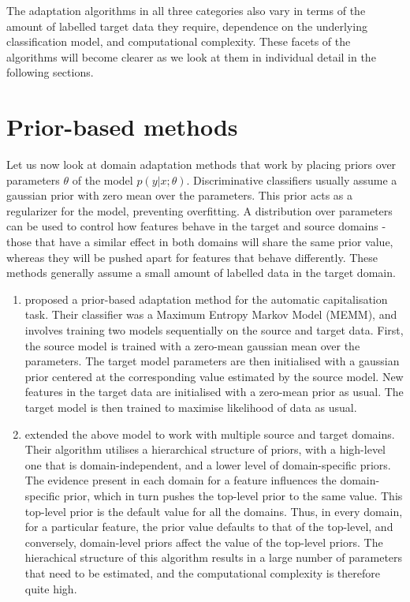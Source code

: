 \documentclass[12pt]{report}
\begin{document}
	The adaptation algorithms in all three categories also vary in terms of the amount of labelled target data they require, dependence on the underlying classification model, and computational complexity. These facets of the algorithms will become clearer as we look at them in individual detail in the following sections.

	\section{Prior-based methods}
	Let us now look at domain adaptation methods that work by placing priors over parameters $\theta$ of the model $p(y|x;\theta)$. Discriminative classifiers usually assume a gaussian prior with zero mean over the parameters. This prior acts as a regularizer for the model, preventing overfitting. A distribution over parameters can be used to control how features behave in the target and source domains - those that have a similar effect in both domains will share the same prior value, whereas they will be pushed apart for features that behave differently. These methods generally assume a small amount of labelled data in the target domain. 
	\begin{enumerate}
		\item \citep{chelba2006adaptation} proposed a prior-based adaptation method for the automatic capitalisation task. Their classifier was a Maximum Entropy Markov Model (MEMM), and involves training two models sequentially on the source and target data. First, the source model is trained with a zero-mean gaussian mean over the parameters. The target model parameters are then initialised with a gaussian prior centered at the corresponding value estimated by the source model. New features in the target data are initialised with a zero-mean prior as usual. The target model is then trained to maximise likelihood of data as usual. 
		\item \citep{finkel2009hierarchical} extended the above model to work with multiple source and target domains. Their algorithm utilises a hierarchical structure of priors, with a high-level one that is domain-independent, and a lower level of domain-specific priors. The evidence present in each domain for a feature influences the domain-specific prior, which in turn pushes the top-level prior to the same value. This top-level prior is the default value for all the domains. Thus, in every domain, for a particular feature, the prior value defaults to that of the top-level, and conversely, domain-level priors affect the value of the top-level priors. The hierachical structure of this algorithm results in a large number of parameters that need to be estimated, and the computational complexity is therefore quite high.
	\end{enumerate}
\end{document}
